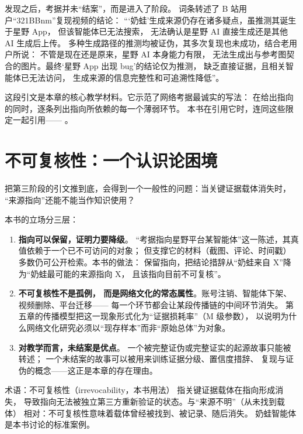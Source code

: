 \begin{nlhistory}[史料与考据]
发现之后，考据并未“结案”，而是进入了阶段。
 词条转述了 B 站用户“321BBnm”复现视频的结论：
 “‘奶蛙’生成来源仍存在诸多疑点，虽推测其诞生于星野 App，
 但该智能体已无法搜索，
 无法确认是星野 AI 直接生成还是其他 AI 生成后上传。
 多种生成路径的推测均被证伪，其多次复现也未成功，结合老用户所说：
 不管是现在还是原来，星野 AI 本身能力有限，
 无法生成出与参考图契合的图片。最终‘星野 App 出现 bug’的结论仅为推测，
缺乏直接证据，且相关智能体已无法访问，
 生成来源的信息完整性和可追溯性降低”\cite{lostmedia2026naiwa}。
\end{nlhistory}

这段引文是本章的核心教学材料。它示范了网络考据最诚实的写法：
 在给出指向的同时，逐条列出指向所依赖的每一个薄弱环节。
 本书在引用它时，连同这些限定一起引用——
 。

\section{不可复核性：一个认识论困境}\label{sec:04:irrevocable}

把第三阶段的引文推到底，会得到一个一般性的问题：当关键证据载体消失时，
 “来源指向”还能不能当作知识使用？

本书的立场分三层：

\begin{enumerate}[label=\arabic*.]
  \item \textbf{指向可以保留，证明力要降级}。
“考据指向星野平台某智能体”这一陈述，其真值依赖于一个已不可访问的对象；
 但支撑它的材料（截图、评论、时间戳）多数仍可公开检索。本书的做法：
 保留指向，把结论措辞从“奶蛙来自 X”降为“奶蛙最可能的来源指向 X，
 且该指向目前不可复核”。
  \item \textbf{不可复核性不是孤例，
而是网络文化的常态属性}。账号注销、智能体下架、视频删除、平台迁移——
 每一个环节都会让某段传播链的中间环节消失。
 第五章的传播模型把这一现象形式化为“证据损耗率”（M 级参数），
 以说明为什么网络文化研究必须以“现存样本”而非“原始总体”为对象。
  \item \textbf{对教学而言，未结案是优点}。
一个被完整证伪或完整证实的起源故事只能被转述；
 一个未结案的故事可以被用来训练证据分级、置信度措辞、
 复现与证伪的概念——这正是本章的存在理由。
\end{enumerate}

\begin{nltermbox}{术语：不可复核性（irrevocability，本书用法）}
指关键证据载体在指向形成消失，
 导致指向无法被独立第三方重新验证的状态。与“来源不明”（从未找到载体）
 相对：不可复核性意味着载体曾经被找到、被记录、随后消失。
 奶蛙智能体  是本书讨论的标准案例。
\end{nltermbox}


